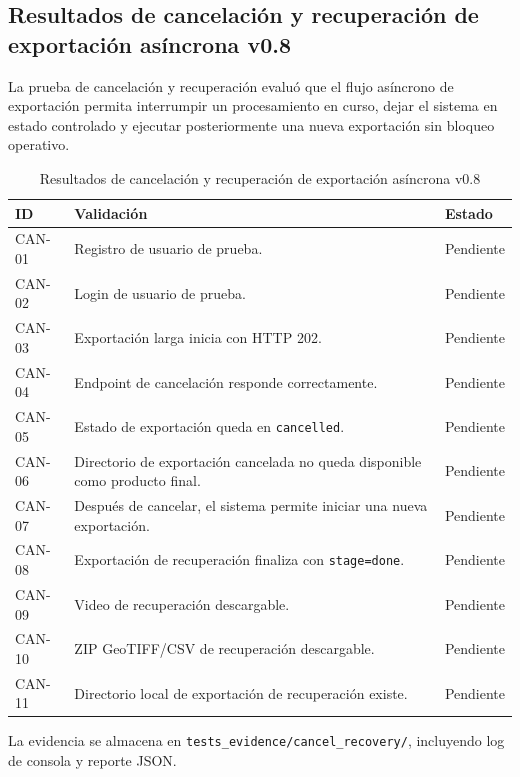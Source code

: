 
\subsection{Resultados de cancelación y recuperación de exportación asíncrona v0.8}

La prueba de cancelación y recuperación evaluó que el flujo asíncrono de exportación
permita interrumpir un procesamiento en curso, dejar el sistema en estado controlado
y ejecutar posteriormente una nueva exportación sin bloqueo operativo.

\begin{table}[H]
\centering
\begin{tabular}{|p{2.4cm}|p{8.6cm}|p{2.2cm}|}
\hline
\textbf{ID} & \textbf{Validación} & \textbf{Estado} \\
\hline
CAN-01 & Registro de usuario de prueba. & Pendiente \\
\hline
CAN-02 & Login de usuario de prueba. & Pendiente \\
\hline
CAN-03 & Exportación larga inicia con HTTP 202. & Pendiente \\
\hline
CAN-04 & Endpoint de cancelación responde correctamente. & Pendiente \\
\hline
CAN-05 & Estado de exportación queda en \texttt{cancelled}. & Pendiente \\
\hline
CAN-06 & Directorio de exportación cancelada no queda disponible como producto final. & Pendiente \\
\hline
CAN-07 & Después de cancelar, el sistema permite iniciar una nueva exportación. & Pendiente \\
\hline
CAN-08 & Exportación de recuperación finaliza con \texttt{stage=done}. & Pendiente \\
\hline
CAN-09 & Video de recuperación descargable. & Pendiente \\
\hline
CAN-10 & ZIP GeoTIFF/CSV de recuperación descargable. & Pendiente \\
\hline
CAN-11 & Directorio local de exportación de recuperación existe. & Pendiente \\
\hline
\end{tabular}
\caption{Resultados de cancelación y recuperación de exportación asíncrona v0.8}
\end{table}

La evidencia se almacena en \texttt{tests\_evidence/cancel\_recovery/}, incluyendo
log de consola y reporte JSON.
